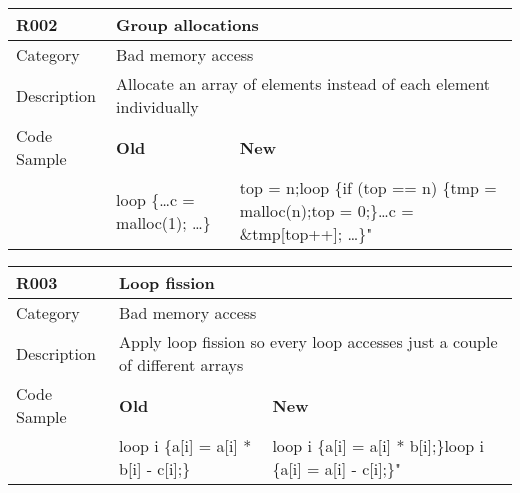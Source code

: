 \begin{tabular}{|p{0.9in}|p{2.0in}|p{2.0in}|} \hline
\textbf{R002}       & \multicolumn{2}{|p{4.0in}|}{\textbf{Group allocations}} \\ \hline
Category            & \multicolumn{2}{|p{4.0in}|}{Bad memory access} \\ \hline
Description         & \multicolumn{2}{|p{4.0in}|}{Allocate an array of elements instead of each element individually} \\ \hline
Code Sample         & \textbf{Old} & \textbf{New} \\ \hline
                    & loop \{\newline   \ldots c = malloc(1); \ldots\newline \}\newline
                    & top = n;\newline loop \{\newline   if (top == n) \{\newline     tmp = malloc(n);\newline     top = 0;\newline   \}\newline   \ldots\newline   c = \&tmp[top++]; \ldots\newline \}" \\ \hline
\end{tabular}

\begin{tabular}{|p{0.9in}|p{2.0in}|p{2.0in}|} \hline
\textbf{R003} & \multicolumn{2}{|p{4.0in}|}{\textbf{Loop fission}} \\ \hline
Category            & \multicolumn{2}{|p{4.0in}|}{Bad memory access} \\ \hline
Description         & \multicolumn{2}{|p{4.0in}|}{Apply loop fission so every loop accesses just a couple of different arrays} \\ \hline
Code Sample         & \textbf{Old} & \textbf{New} \\ \hline
                    & loop i \{\newline   a[i] = a[i] * b[i] - c[i];\newline \}
                    & loop i \{\newline   a[i] = a[i] * b[i];\newline \}\newline loop i \{\newline   a[i] = a[i] - c[i];\newline \}" \\ \hline
\end{tabular}

